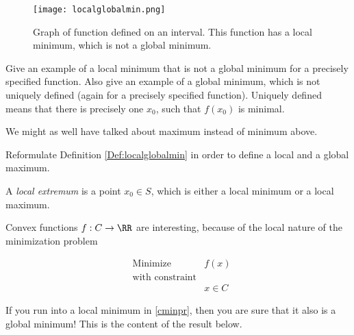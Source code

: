 \documentclass{article}
\begin{document}
\begin{frameit}
\begin{figure}
\texttt{[image: localglobalmin.png]}

Graph of function defined on an interval. This function has a local minimum, which is not
a global minimum.
\end{figure}
\end{frameit}


\beginshex
Give an example of a local minimum that is not a global minimum for a precisely specified function.
Also give
an example of a global minimum, which is not uniquely defined (again for a precisely specified function).
Uniquely defined means that there is precisely one $x_0$, such that $f(x_0)$ is minimal.
\endshex

We might as well have talked about maximum instead of minimum above.

\beginshex
Reformulate Definition \ref{Def:localglobalmin} in order to define
a local and a global maximum.
\endshex

A \emph{local extremum} is a point $x_0\in S$, which is either a
local minimum or a local maximum.



Convex functions $f: C\rightarrow \RR$ are interesting, because of the local
nature of the minimization problem

\begin{align}\label{cminpr}
    &\text{Minimize} &f(x)\\
    &\text{with constraint}\\
    &&x\in C
\end{align}

If you run into a local minimum in \eqref{cminpr},
then you are sure that it also is a global minimum! This is the
content of the result below. 
\end{document}
